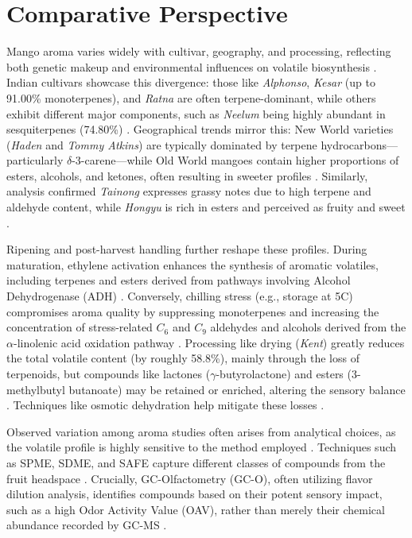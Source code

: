 \section{Comparative Perspective}
Mango aroma varies widely with cultivar, geography, and processing, reflecting both genetic makeup and environmental influences on volatile biosynthesis \cite*{A13_ElHadi2013,A16_Tandel2023}. Indian cultivars showcase this divergence: those like \textit{Alphonso}, \textit{Kesar} (up to 91.00\% monoterpenes), and \textit{Ratna} are often terpene-dominant, while others exhibit different major components, such as \textit{Neelum} being highly abundant in sesquiterpenes (74.80\%) \cite*{A16_Tandel2023}. Geographical trends mirror this: New World varieties (\textit{Haden} and \textit{Tommy Atkins}) are typically dominated by terpene hydrocarbons—particularly $\delta$-3-carene—while Old World mangoes contain higher proportions of esters, alcohols, and ketones, often resulting in sweeter profiles \cite*{A13_ElHadi2013}. Similarly, analysis confirmed \textit{Tainong} expresses grassy notes due to high terpene and aldehyde content, while \textit{Hongyu} is rich in esters and perceived as fruity and sweet \cite*{A15_Xie2023}.

\vspace{1em}
Ripening and post-harvest handling further reshape these profiles. During maturation, ethylene activation enhances the synthesis of aromatic volatiles, including terpenes and esters derived from pathways involving Alcohol Dehydrogenase (ADH) \cite*{A10_Singh2010}. Conversely, chilling stress (e.g., storage at 5\textdegree C) compromises aroma quality by suppressing monoterpenes and increasing the concentration of stress-related $C_6$ and $C_9$ aldehydes and alcohols derived from the $\alpha$-linolenic acid oxidation pathway \cite*{A11_Sivankalyani2017}. Processing like drying (\textit{Kent}) greatly reduces the total volatile content (by roughly 58.8\%), mainly through the loss of terpenoids, but compounds like lactones ($\gamma$-butyrolactone) and esters (3-methylbutyl butanoate) may be retained or enriched, altering the sensory balance \cite*{A07_Bonneau2016}. Techniques like osmotic dehydration help mitigate these losses \cite*{A02_Moreno2010}.

\vspace{1em}
Observed variation among aroma studies often arises from analytical choices, as the volatile profile is highly sensitive to the method employed \cite*{A13_ElHadi2013}. Techniques such as SPME, SDME, and SAFE capture different classes of compounds from the fruit headspace \cite*{A01_Aguirre-Lopez_2023,A07_Bonneau2016}. Crucially, GC-Olfactometry (GC-O), often utilizing flavor dilution analysis, identifies compounds based on their potent sensory impact, such as a high Odor Activity Value (OAV), rather than merely their chemical abundance recorded by GC-MS \cite*{A01_Aguirre-Lopez_2023,A07_Bonneau2016}.

